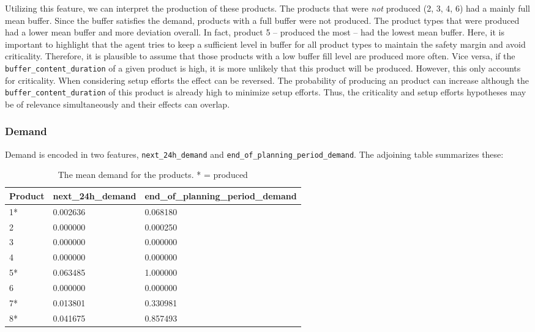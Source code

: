 Utilizing this feature, we can interpret the production of these products.
The products that were \textit{not} produced (2, 3, 4, 6) had a mainly full mean buffer. Since the buffer satisfies the demand, products with a full buffer were not produced. The product types that were produced had a lower mean buffer and more deviation overall. In fact, product 5 – produced the most – had the lowest mean buffer. Here, it is important to highlight that the agent tries to keep a sufficient level in buffer for all product types to maintain the safety margin and avoid criticality. Therefore, it is plausible to assume that those products with a low buffer fill level are produced more often. Vice versa, if the \texttt{buffer\_content\_duration} of a given product is high, it is more unlikely that this product will be produced. However, this only accounts for criticality. When considering setup efforts the effect can be reversed. The probability of producing an product can increase although the \texttt{buffer\_content\_duration} of this product is already high to minimize setup efforts. Thus, the criticality and setup efforts hypotheses may be of relevance simultaneously and their effects can overlap.

\subsubsection{Demand}
Demand is encoded in two features, \texttt{next\_24h\_demand} and \texttt{end\_of\_planning\_period\_demand}. The adjoining table summarizes these:

\begin{table}[ht!]
    \footnotesize
    \centering
    \caption{The mean demand for the products. * = produced}
    \label{t:demand_agg}
    \begin{tabularx}{\textwidth}{lXX}
        \toprule
        \textbf{Product} & \textbf{next\_24h\_demand} & \textbf{end\_of\_planning\_period\_demand} \\
        \midrule
        1*               & 0.002636                   & 0.068180                                   \\
        2                & 0.000000                   & 0.000250                                   \\
        3                & 0.000000                   & 0.000000                                   \\
        4                & 0.000000                   & 0.000000                                   \\
        5*               & 0.063485                   & 1.000000                                   \\
        6                & 0.000000                   & 0.000000                                   \\
        7*               & 0.013801                   & 0.330981                                   \\
        8*               & 0.041675                   & 0.857493                                   \\
        \bottomrule
    \end{tabularx}
\end{table}
\FloatBarrier

